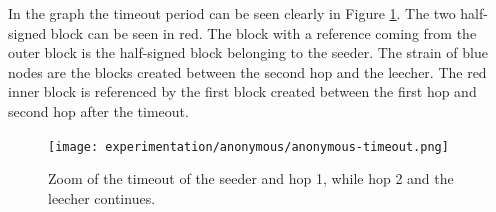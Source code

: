 In the graph the timeout period can be seen clearly in Figure \ref{fig:synthetic-anonymous-timeout}.
The two half-signed block can be seen in red.
The block with a reference coming from the outer block is the half-signed block belonging to the seeder.
The strain of blue nodes are the blocks created between the second hop and the leecher.
The red inner block is referenced by the first block created between the first hop and second hop after the timeout.

\begin{figure}
	\centerline{\texttt{[image: experimentation/anonymous/anonymous-timeout.png]}}
	\caption{Zoom of the timeout of the seeder and hop 1, while hop 2 and the leecher continues.}
	\label{fig:synthetic-anonymous-timeout}
\end{figure}



